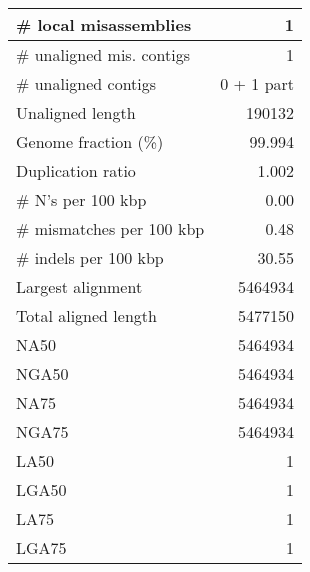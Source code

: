 \documentclass[12pt,a4paper]{article}
\begin{document}
\begin{table}[ht]
\begin{center}
\begin{tabular}{|l*{1}{|r}|}
\# local misassemblies & 1 \\ \hline
\# unaligned mis. contigs & 1 \\ \hline
\# unaligned contigs & 0 + 1 part \\ \hline
Unaligned length & 190132 \\ \hline
Genome fraction (\%) & 99.994 \\ \hline
Duplication ratio & 1.002 \\ \hline
\# N's per 100 kbp & 0.00 \\ \hline
\# mismatches per 100 kbp & 0.48 \\ \hline
\# indels per 100 kbp & 30.55 \\ \hline
Largest alignment & 5464934 \\ \hline
Total aligned length & 5477150 \\ \hline
NA50 & 5464934 \\ \hline
NGA50 & 5464934 \\ \hline
NA75 & 5464934 \\ \hline
NGA75 & 5464934 \\ \hline
LA50 & 1 \\ \hline
LGA50 & 1 \\ \hline
LA75 & 1 \\ \hline
LGA75 & 1 \\ \hline
\end{tabular}
\end{center}
\end{table}
\end{document}

